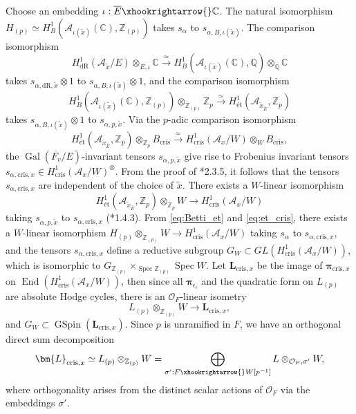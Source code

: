 \documentclass{amsart}
\numberwithin{equation}{subsection}
\numberwithin{theorem}{section}
\theoremstyle{definition}
\theoremstyle{remark}
\newcommand{\bC}{\mathbb{C}}
\newcommand{\bQ}{\mathbb{Q}}
\newcommand{\bZ}{\mathbb{Z}}
\newcommand{\cA}{\mathcal{A}}
\newcommand{\cO}{\mathcal{O}}
\newcommand{\et}{{\text{\'et}}}
\newcommand{\dR}{_{\mathrm{dR}}}
\newcommand{\cris}{_{\mathrm{cris}}}
\DeclareMathOperator{\GSpin}{GSpin}
\DeclareMathOperator{\Gal}{Gal}
\DeclareMathOperator{\End}{End}
\DeclareMathOperator{\Spec}{Spec}
\begin{document}
Choose an embedding $\iota: \overline{E}\xhookrightarrow{}\bC$. The  natural isomorphism $H_{(p)} \simeq H^1_B(\mathcal{A}_{\iota(\tilde{x})}(\bC), \bZ_{(p)})$ takes $s_{\alpha}$ to $s_{\alpha, B, \iota(\tilde{x})}$. 
The comparison isomorphism \begin{equation} \label{eq:Betti_deRham}
    H^1\dR(\mathcal{A}_{\tilde{x}}/E) \otimes_{E, \iota} \bC \xrightarrow{\simeq} H^1_B(\mathcal{A}_{\iota(\tilde{x})}(\bC), \bQ)\otimes_{\bQ} \bC
\end{equation}
takes $s_{\alpha, \mathrm{dR}, \tilde{x}}\otimes 1$ to $s_{\alpha, B, \iota(\tilde{x})}\otimes 1$, and the comparison isomorphism \begin{equation}\label{eq:Betti_et}
    H^1_B(\mathcal{A}_{\iota(\tilde{x})}(\bC), \bZ_{(p)})\otimes_{\bZ_{(p)}} \bZ_p \xrightarrow{\simeq}H^1_{\et}(\mathcal{A}_{\tilde{x}_{\bar{E}}}, \bZ_p)
\end{equation} takes $s_{\alpha, B,\iota(\tilde{x})}\otimes 1$ to $s_{\alpha, p, \tilde{x}}$. 
Via the $p$-adic comparison isomorphism \begin{equation}
    H^1_{\et}(\mathcal{A}_{\tilde{x}_{\bar{E}}}, \bZ_p)\otimes_{\bZ_p} B\cris \xrightarrow{\simeq} H^1\cris(\mathcal{A}_x/W)\otimes_W B\cris,
\end{equation}
the $\Gal(\overline{F_v}/E)$-invariant tensors $s_{\alpha, p, \tilde{x}}$ give rise to Frobenius invariant tensors $s_{\alpha, \mathrm{cris}, x} \in H^1\cris(\mathcal{A}_x/W)^\otimes$. From the proof of \cite{MR2669706}*{2.3.5}, it follows that the tensors $s_{\alpha, \mathrm{cris}, x}$ are independent of the choice of $\tilde{x}$. 
There exists a $W$-linear isomorphism \begin{equation} \label{eq:et_cris}
    H^1_{\et}(\mathcal{A}_{\tilde{x}_{\bar{E}}}, \bZ_p)\otimes_{\bZ_p} W \xrightarrow{} H^1\cris(\mathcal{A}_x/W)
\end{equation} taking $s_{\alpha, p, \tilde{x}}$ to $s_{\alpha, \mathrm{cris}, x}$ (\cite{MR2669706}*{1.4.3}). From \eqref{eq:Betti_et} and \eqref{eq:et_cris}, there exists a $W$-linear isomorphism $H_{(p)} \otimes_{\mathbb{Z}_{(p)}} W \to  H^1\cris(\mathcal{A}_x/W)$ taking $s_\alpha$ to $s_{\alpha, \mathrm{cris}, x}$, and the tensors $s_{\alpha, \mathrm{cris}, x}$ define a reductive subgroup $G_W\subset GL(H^1\cris(\mathcal{A}_x/W))$, which is isomorphic to $G_{\bZ_{(p)}}\times_{\Spec \bZ_{(p)}}\Spec W$. Let $\bm{L}_{\mathrm{cris}, x}$ be the image of $\bm{\pi}_{\mathrm{cris}, x}$ on $\End(H^1\cris(\cA_x/W))$, then since all $\bm{\pi}_{{\epsilon_i}}$ and the quadratic form on $L_{(p)}$ are absolute Hodge cycles, there is an $\mathcal{O}_F$-linear isometry \begin{equation}
    L_{(p)}\otimes_{\bZ_{(p)}} W \to \bm{L}_{\mathrm{cris}, x},
\end{equation} and $G_W \subset \GSpin(\bm{L}_{\mathrm{cris},x})$. Since $p$ is unramified in $F$, we have an orthogonal direct sum decomposition \begin{equation} \label{eq:orthogonaldecomp}
    \bm{L}_{\mathrm{cris}, x} \simeq  L_{(p)}\otimes_{\bZ_{(p)}} W=\bigoplus_{\sigma':F\xhookrightarrow{}W[p^{-1}]}L\otimes_{\cO_F, \sigma'} W,
\end{equation} where orthogonality arises from the distinct scalar actions of $\cO_F$ via the embeddings $\sigma'$. 
\end{document}
